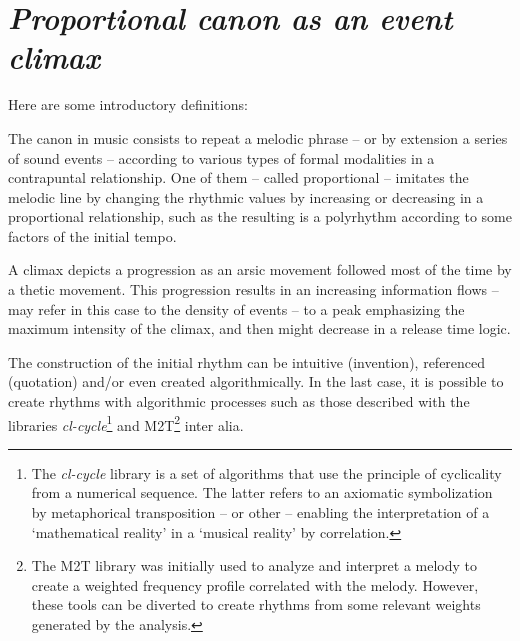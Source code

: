 
\section{\textsl{Proportional canon as an event climax}}

\label{imp2}

Here are some introductory definitions:

\smallskip

{The canon in music consists to repeat a melodic phrase -- or by extension a series of sound events -- according to various types of formal modalities in a contrapuntal relationship. One of them -- called proportional -- imitates the melodic line by changing the rhythmic values by increasing or decreasing in a proportional relationship, such as the resulting is a polyrhythm according to some factors of the initial tempo.}

{A climax depicts a progression as an arsic movement followed most of the time by a thetic movement. This progression results in an increasing information flows -- may refer in this case to the density of events -- to a peak emphasizing the maximum intensity of the climax, and then might decrease in a release time logic.}
  
  \bigskip

 The construction of the initial rhythm can be intuitive (invention), referenced (quotation) and/or even created algorithmically. In the last case, it is possible to create rhythms with algorithmic processes such as those described with the libraries \textsl{cl-cycle}\footnote{The \textsl{cl-cycle} library is a set of algorithms that use the principle of cyclicality from a numerical sequence. The latter refers to an axiomatic symbolization by metaphorical transposition -- or other -- enabling the interpretation of a `mathematical reality' in a `musical reality' by correlation.} and M2T\footnote{The M2T library was initially used to analyze and interpret a melody to create a weighted frequency profile correlated with the melody. However, these tools can be diverted to create rhythms from some relevant weights generated by the analysis.} inter alia.
  
